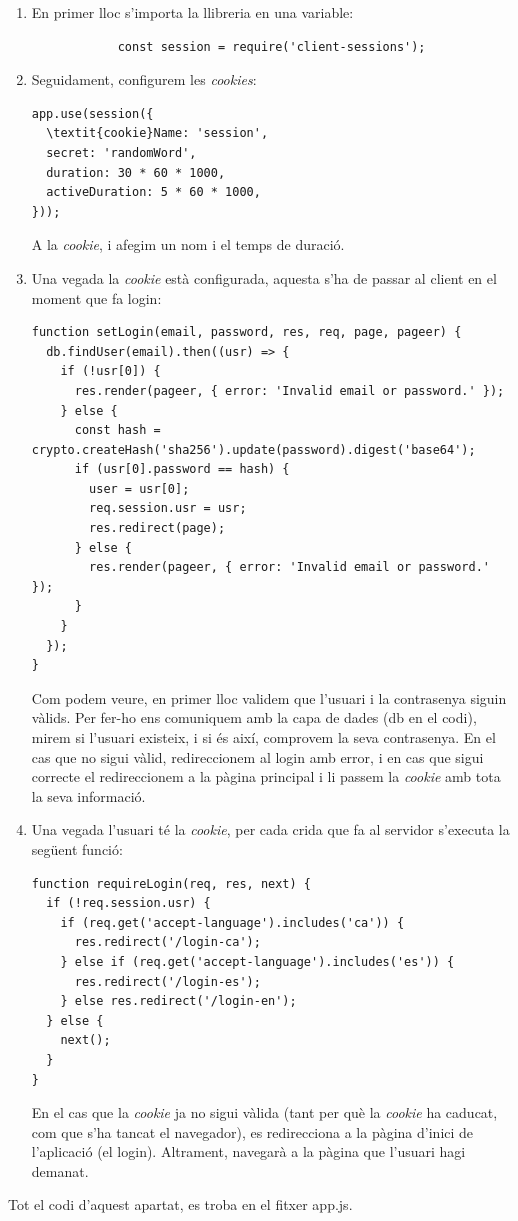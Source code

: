 \documentclass[11pt,catalan,listoffigures,listoftables]{tfgetsinf}
\begin{document}
\begin{enumerate}
	\item En primer lloc s'importa la llibreria en una variable:
		\begin{lstlisting}
			const session = require('client-sessions');
		\end{lstlisting}
	\item Seguidament, configurem les \textit{cookies}:
\begin{lstlisting}
app.use(session({
  \textit{cookie}Name: 'session',
  secret: 'randomWord',
  duration: 30 * 60 * 1000,
  activeDuration: 5 * 60 * 1000,
}));	
\end{lstlisting}
A la \textit{cookie}, i afegim un nom i el temps de duració.
\item Una vegada la \textit{cookie} està configurada, aquesta s'ha de passar al client en el moment que fa login:
\begin{lstlisting}
function setLogin(email, password, res, req, page, pageer) {
  db.findUser(email).then((usr) => {
    if (!usr[0]) {
      res.render(pageer, { error: 'Invalid email or password.' });
    } else {
      const hash = crypto.createHash('sha256').update(password).digest('base64');
      if (usr[0].password == hash) {
        user = usr[0];
        req.session.usr = usr;
        res.redirect(page);
      } else {
        res.render(pageer, { error: 'Invalid email or password.' });
      }
    }
  });
}
\end{lstlisting}
Com podem veure, en primer lloc validem que l'usuari i la contrasenya siguin vàlids. Per fer-ho ens comuniquem amb la capa de dades (db en el codi), mirem si l'usuari existeix, i si és així, comprovem la seva contrasenya. En el cas que no sigui vàlid, redireccionem al login amb error, i en cas que sigui correcte el redireccionem a la pàgina principal i li passem la \textit{cookie} amb tota la seva informació.
\item Una vegada l'usuari té la \textit{cookie}, per cada crida que fa al servidor s'executa la següent funció:
\begin{lstlisting}
function requireLogin(req, res, next) {
  if (!req.session.usr) {
    if (req.get('accept-language').includes('ca')) {
      res.redirect('/login-ca');
    } else if (req.get('accept-language').includes('es')) {
      res.redirect('/login-es');  
    } else res.redirect('/login-en');
  } else {
    next();
  }
}
\end{lstlisting}
En el cas que la \textit{cookie} ja no sigui vàlida (tant per què la \textit{cookie} ha caducat, com que s'ha tancat el navegador), es redirecciona a la pàgina d'inici de l'aplicació (el login). Altrament, navegarà a la pàgina que l'usuari hagi demanat.
\end{enumerate}
Tot el codi d'aquest apartat, es troba en el fitxer app.js.
\end{document}
